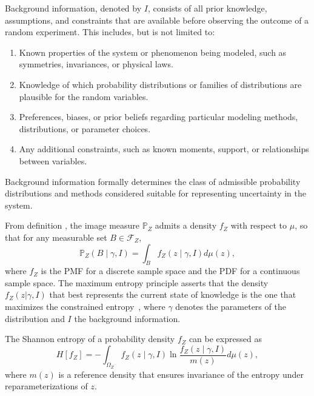 \begin{definition}
	\label{def:background_information}
	Background information, denoted by $I$, consists of all prior knowledge, assumptions, and constraints that are available before observing the outcome of a random experiment. This includes, but is not limited to:
	\begin{enumerate}
		\item Known properties of the system or phenomenon being modeled, such as symmetries, invariances, or physical laws.
		\item Knowledge of which probability distributions or families of distributions are plausible for the random variables.
		\item Preferences, biases, or prior beliefs regarding particular modeling methods, distributions, or parameter choices.
		\item Any additional constraints, such as known moments, support, or relationships between variables.
	\end{enumerate}
	Background information formally determines the class of admissible probability distributions and methods considered suitable for representing uncertainty in the system.
\end{definition}

From definition , the image measure $\mathbb{P}_Z$ admits a density $f_Z$ with respect to $\mu$, so that for any measurable set $B\in \mathcal{F}_Z$,
\begin{equation}
	\mathbb{P}_Z(B \mid\gamma,I) = \int_B f_Z(z\mid \gamma,I) d\mu(z),
	\label{eq:max_ent_probability_measure}
\end{equation}
where $f_Z$ is the PMF for a discrete sample space and the PDF for a continuous sample space. The maximum entropy principle asserts that the density $f_Z(z | \gamma, I)$ that best represents the current state of knowledge is the one that maximizes the constrained entropy~\citep{Sivia2006}, where $\gamma$ denotes the parameters of the distribution and $I$ the background information. 

The Shannon entropy of a probability density $f_Z$ can be expressed as
\begin{equation}
	H[f_Z] = - \int_{\Omega_Z} f_Z(z \mid \gamma, I) 
	\ln \frac{f_Z(z \mid \gamma, I)}{m(z)}  d\mu(z),
\end{equation}
where $m(z)$ is a reference density that ensures invariance of the entropy under reparameterizations of $z$. 

